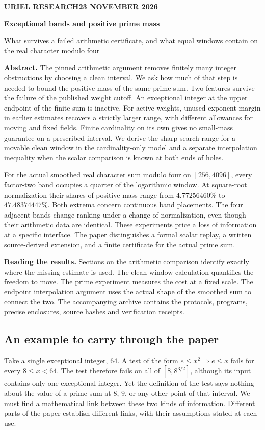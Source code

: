 \documentclass[12pt,letterpaper]{article}
\begin{document}
\thispagestyle{plain}
{\sffamily\small\bfseries\color{accent}URIEL RESEARCH\hfill 23 NOVEMBER 2026}\par\vspace{13pt}
{\Huge\bfseries\color{ink}Exceptional bands and positive prime mass\par}\vspace{7pt}
{\Large\color{mute}What survives a failed arithmetic certificate, and what equal windows contain on the real character modulo four\par}\vspace{14pt}
\textbf{Abstract.} The pinned arithmetic argument removes finitely many integer obstructions by choosing a clean interval. We ask how much of that step is needed to bound the positive mass of the same prime sum. Two features survive the failure of the published weight cutoff. An exceptional integer at the upper endpoint of the finite sum is inactive. For active weights, unused exponent margin in earlier estimates recovers a strictly larger range, with different allowances for moving and fixed fields. Finite cardinality on its own gives no small-mass guarantee on a prescribed interval. We derive the sharp search range for a movable clean window in the cardinality-only model and a separate interpolation inequality when the scalar comparison is known at both ends of holes.

For the actual smoothed real character sum modulo four on \([256,4096]\), every factor-two band occupies a quarter of the logarithmic window. At square-root normalization their shares of positive mass range from \(4.77256460\%\) to \(47.48374447\%\). Both extrema concern continuous band placements. The four adjacent bands change ranking under a change of normalization, even though their arithmetic data are identical. These experiments price a loss of information at a specific interface. The paper distinguishes a formal scalar replay, a written source-derived extension, and a finite certificate for the actual prime sum.

\medskip\textbf{Reading the results.} Sections on the arithmetic comparison identify exactly where the missing estimate is used. The clean-window calculation quantifies the freedom to move. The prime experiment measures the cost at a fixed scale. The endpoint interpolation argument uses the actual shape of the smoothed sum to connect the two. The accompanying archive contains the protocols, programs, precise enclosures, source hashes and verification receipts.
\clearpage\tableofcontents
\bigskip
\subsection*{An example to carry through the paper}
Take a single exceptional integer, \(64\). A test of the form \(e\le x^2\Rightarrow e\le x\) fails for every \(8\le x<64\). The test therefore fails on all of \([8,8^{3/2}]\), although its input contains only one exceptional integer. Yet the definition of the test says nothing about the value of a prime sum at \(8\), \(9\), or any other point of that interval. We must find a mathematical link between these two kinds of information. Different parts of the paper establish different links, with their assumptions stated at each use.
\clearpage
\end{document}
